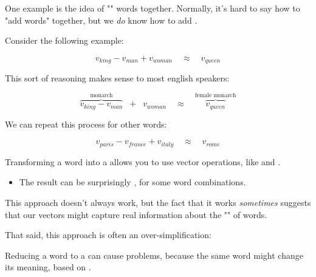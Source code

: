         One example is the idea of "" words together. Normally, it's hard to say how to "add words" together, but we \textit{do} know how to add .

        Consider the following example:

        \begin{equation}
            v_{king} - v_{man} + v_{woman}  \quad\approx\quad v_{queen}
        \end{equation}

        This sort of reasoning makes sense to most english speakers: 

        \begin{equation}
            \overbrace{ v_{king} - v_{man} }^{\text{monarch}} \;\;+\;\; v_{woman} 
            \quad\approx\quad \overbrace{v_{queen}}^{\text{female monarch}}
        \end{equation}

        We can repeat this process for other words:

        \begin{equation}
            v_{paris} - v_{france} + v_{italy}  \quad\approx\quad v_{rome}
        \end{equation}

        \begin{concept}
            Transforming a word into a  allows you to use vector operations, like  and .

            \begin{itemize}
                \item The result can be surprisingly , for some word combinations.
            \end{itemize}

            This approach doesn't always work, but the fact that it works \textit{sometimes} suggests that our vectors might capture real information about the "" of words.
        \end{concept}

        That said, this approach is often an over-simplification:\\

        \begin{concept}
            Reducing a word to a  can cause problems, because the same word might change its meaning, based on .
        \end{concept}

